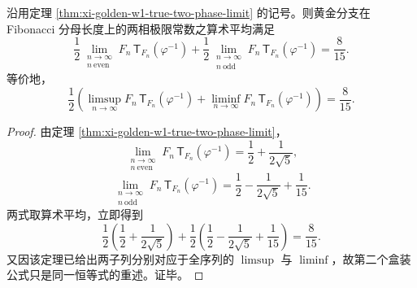 \begin{corollary}\label{cor:xi-golden-w1-two-phase-arithmetic-mean-eight-fifteenths}
沿用定理 \ref{thm:xi-golden-w1-true-two-phase-limit} 的记号。则黄金分支在 Fibonacci 分母长度上的两相极限常数之算术平均满足
\[
\boxed{\;
\frac12\lim_{\substack{n\to\infty\\ n\ \mathrm{even}}}
F_n\,\mathsf{T}_{F_n}(\varphi^{-1})
+
\frac12\lim_{\substack{n\to\infty\\ n\ \mathrm{odd}}}
F_n\,\mathsf{T}_{F_n}(\varphi^{-1})
=
\frac{8}{15}.\;}
\]
等价地，
\[
\boxed{\;
\frac12\left(\limsup_{n\to\infty}F_n\,\mathsf{T}_{F_n}(\varphi^{-1})
+
\liminf_{n\to\infty}F_n\,\mathsf{T}_{F_n}(\varphi^{-1})\right)
=
\frac{8}{15}.\;}
\]
\end{corollary}
\begin{proof}
由定理 \ref{thm:xi-golden-w1-true-two-phase-limit}，
\[
\lim_{\substack{n\to\infty\\ n\ \mathrm{even}}}
F_n\,\mathsf{T}_{F_n}(\varphi^{-1})
=
\frac12+\frac{1}{2\sqrt5},
\]
\[
\lim_{\substack{n\to\infty\\ n\ \mathrm{odd}}}
F_n\,\mathsf{T}_{F_n}(\varphi^{-1})
=
\frac12-\frac{1}{2\sqrt5}+\frac1{15}.
\]
两式取算术平均，立即得到
\[
\frac12\left(\frac12+\frac{1}{2\sqrt5}\right)
+
\frac12\left(\frac12-\frac{1}{2\sqrt5}+\frac1{15}\right)
=
\frac{8}{15}.
\]
又因该定理已给出两子列分别对应于全序列的 \(\limsup\) 与 \(\liminf\)，故第二个盒装公式只是同一恒等式的重述。证毕。
\end{proof}

